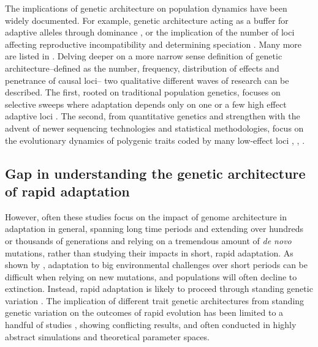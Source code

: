 \documentclass{article}
\begin{document}
The implications of genetic architecture on population dynamics have been widely documented. For example, genetic architecture acting as a buffer for adaptive alleles through dominance \citep{Yamamichi2017-uj}, or the implication of the number of loci affecting reproductive incompatibility and determining speciation \citep{Orr1996-eq}. Many more are listed in \citep{Bertram2019-sg}. Delving deeper on a more narrow sense definition of genetic architecture--defined as the number, frequency, distribution of effects and penetrance of causal loci-- two qualitative different waves of research can be described. The first, rooted on traditional population genetics, focuses on selective sweeps where adaptation depends only on one or a few high effect adaptive loci \citep{Hermisson2005-ii,Barrett2008-tj}. The second, from quantitative genetics and strengthen with the advent of newer sequencing technologies and statistical methodologies, focus on the evolutionary dynamics of polygenic traits coded by many low-effect loci \citep{John2020-xc}  \citep{Jain2017-mb}, \citep{Barghi2020-aa} \citep{Hayward2021-ji, Stetter2018-st, Thornton2019-ww},  \citep{Hollinger2019-lb}. 

\subsection{Gap in understanding the genetic architecture of rapid adaptation}
However, often these studies focus on the impact of genome architecture in adaptation in general, spanning long time periods and extending over hundreds or thousands of generations and relying on a tremendous amount of \textit{de novo} mutations, rather than studying their impacts in short, rapid adaptation. As shown by \citep{Orr2008-jl}, adaptation to big environmental challenges over short periods can be difficult when relying on new mutations, and populations will often decline to extinction. Instead, rapid adaptation is likely to proceed through standing genetic variation \citep{Barrett2008-tj}. The implication of different trait genetic architectures from standing genetic variation on the outcomes of rapid evolution has been limited to a handful of studies \citep{Gomulkiewicz2010-wr, Kardos2021-jd}, showing conflicting results, and often conducted in highly abstract simulations and theoretical parameter spaces.
\end{document}
